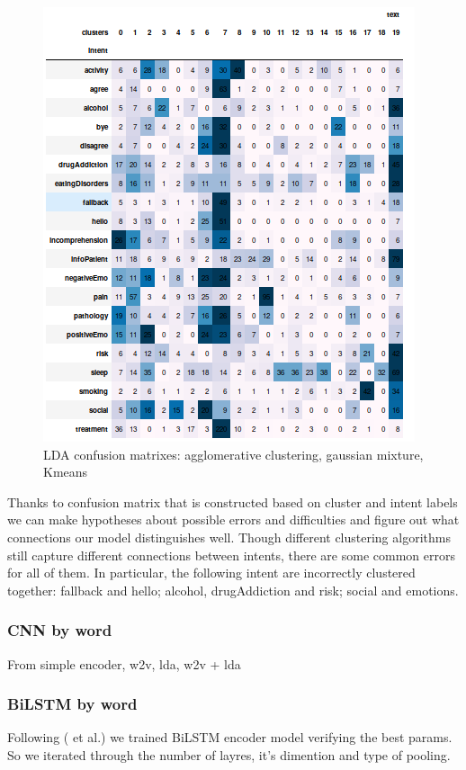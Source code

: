 \documentclass[11pt]{article}
\begin{document}
\begin{figure}[h]
	\includegraphics[scale=0.28]{lda_km_cm.png}
	\caption{LDA confusion matrixes: agglomerative clustering, gaussian mixture, Kmeans}
\label{lda_gm_cm}
\end{figure}
\FloatBarrier

Thanks to confusion matrix that is constructed based on cluster and
intent labels we can make hypotheses about possible errors and
difficulties and figure out what connections our model distinguishes
well. Though different clustering algorithms still capture different
connections between intents, there are some common errors for all of
them. In particular, the following intent are incorrectly clustered
together: fallback and hello; alcohol, drugAddiction and risk; social
and emotions.

\subsubsection{CNN by word}
From simple encoder, w2v, lda, w2v + lda

\subsubsection{BiLSTM by word}

Following ( et al.) we trained BiLSTM encoder model verifying the best params. So we iterated through the number of layres, it's dimention and type of pooling.
\end{document}
